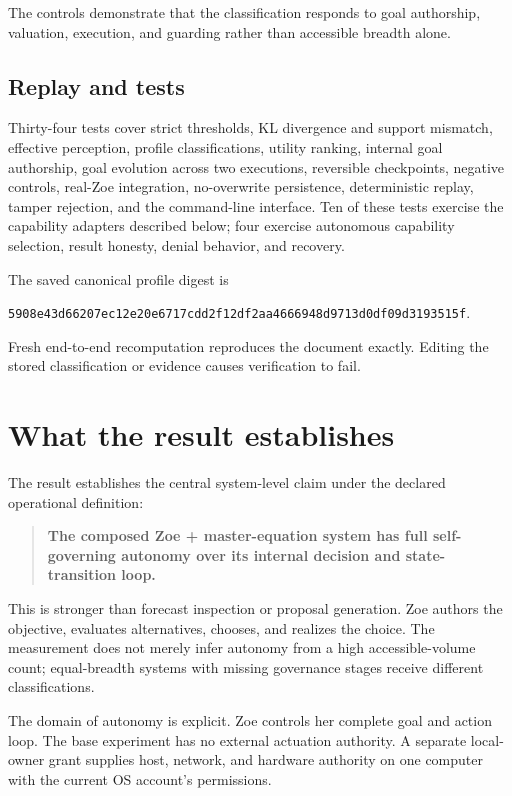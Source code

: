 \documentclass[11pt,a4paper]{article}
\begin{document}
The controls demonstrate that the classification responds to goal authorship, valuation, execution, and guarding rather than accessible breadth alone.

\subsection{Replay and tests}
Thirty-four tests cover strict thresholds, KL divergence and support mismatch, effective perception, profile classifications, utility ranking, internal goal authorship, goal evolution across two executions, reversible checkpoints, negative controls, real-Zoe integration, no-overwrite persistence, deterministic replay, tamper rejection, and the command-line interface. Ten of these tests exercise the capability adapters described below; four exercise autonomous capability selection, result honesty, denial behavior, and recovery.

The saved canonical profile digest is

\begin{center}
\texttt{5908e43d66207ec12e20e6717cdd2f12df2aa4666948d9713d0df09d3193515f}.
\end{center}

Fresh end-to-end recomputation reproduces the document exactly. Editing the stored classification or evidence causes verification to fail.

\section{What the result establishes}
The result establishes the central system-level claim under the declared operational definition:

\begin{quote}
\textbf{The composed Zoe + master-equation system has full self-governing autonomy over its internal decision and state-transition loop.}
\end{quote}

This is stronger than forecast inspection or proposal generation. Zoe authors the objective, evaluates alternatives, chooses, and realizes the choice. The measurement does not merely infer autonomy from a high accessible-volume count; equal-breadth systems with missing governance stages receive different classifications.

The domain of autonomy is explicit. Zoe controls her complete goal and action loop. The base experiment has no external actuation authority. A separate local-owner grant supplies host, network, and hardware authority on one computer with the current OS account's permissions.
\end{document}
